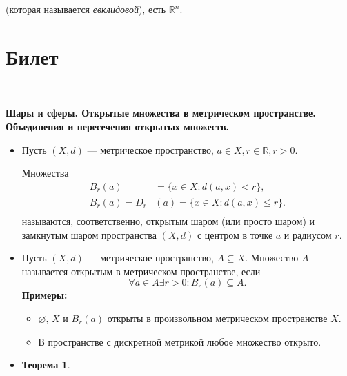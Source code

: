 \documentclass[a4paper,100pt]{article}
\theoremstyle{indented}
\newtheorem{theorem}{Теорема}
\begin{document}
(которая называется \textit{евклидовой}), есть $\mathbb{R}^n$.

\section{Билет} \

\medskip

\textbf{Шары и сферы. Открытые множества в метрическом пространстве. Объединения и пересечения открытых множеств.}
    \begin{itemize}
    \item Пусть $\left(X, d\right)$ --- метрическое пространство, $a \in X, r \in \mathbb R, r > 0.$
    
    Множества 
    \[
    \begin{aligned}
        B_r(a) &= \{x \in X : d(a,x) < r\}, \\
        \overline{B_r} (a) = D_r &(a) = \{x \in X: d(a,x) \leq r\}. \\
    \end{aligned}
    \]
    называются, соответственно, открытым шаром (или просто шаром) и замкнутым шаром пространства $\left(X,d\right)$ с центром в точке $a$ и радиусом $r$.
    \item Пусть $\left(X, d\right)$ --- метрическое пространство, $A \subseteq X$. Множество $A$ называется открытым в метрическом пространстве, если
    \[
        \forall a \in A \exists r > 0: B_r(a) \subseteq A.
    \]
    \textbf{Примеры:} \begin{itemize}
        \item $\varnothing$, $X$ и $B_r(a)$ открыты в произвольном метрическом пространстве $X$.
        \item В пространстве с дискретной метрикой любое множество открыто.
    \end{itemize}
    \item 
    \begin{theorem}
    

\end{theorem}
\end{itemize}
\end{document}
